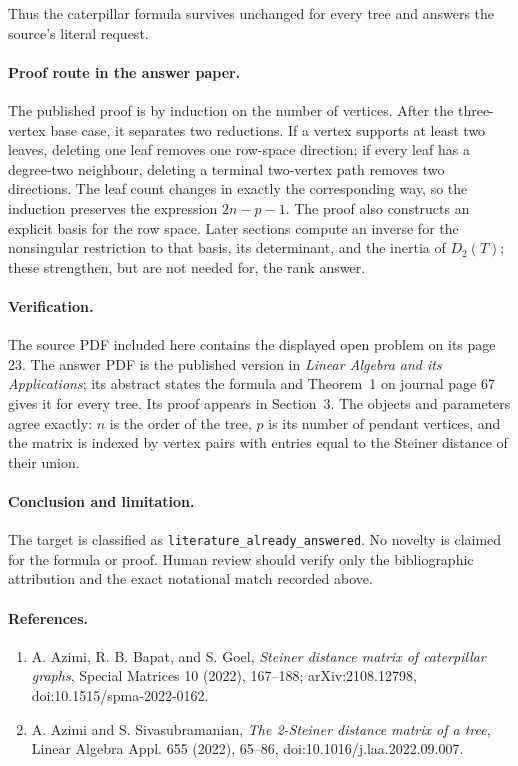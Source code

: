 \documentclass[11pt]{article}
\begin{document}
Thus the caterpillar formula survives unchanged for every tree and answers
the source's literal request.

\paragraph{Proof route in the answer paper.}
The published proof is by induction on the number of vertices.  After the
three-vertex base case, it separates two reductions.  If a vertex supports at
least two leaves, deleting one leaf removes one row-space direction; if every
leaf has a degree-two neighbour, deleting a terminal two-vertex path removes
two directions.  The leaf count changes in exactly the corresponding way, so
the induction preserves the expression $2n-p-1$.  The proof also constructs
an explicit basis for the row space.  Later sections compute an inverse for
the nonsingular restriction to that basis, its determinant, and the inertia
of $D_2(T)$; these strengthen, but are not needed for, the rank answer.

\paragraph{Verification.}
The source PDF included here contains the displayed open problem on its page
23.  The answer PDF is the published version in \emph{Linear Algebra and its
Applications}; its abstract states the formula and Theorem~1 on journal page
67 gives it for every tree.  Its proof appears in Section~3.  The objects and
parameters agree exactly: $n$ is the order of the tree, $p$ is its number of
pendant vertices, and the matrix is indexed by vertex pairs with entries equal
to the Steiner distance of their union.

\paragraph{Conclusion and limitation.}
The target is classified as \texttt{literature\_already\_answered}.  No
novelty is claimed for the formula or proof.  Human review should verify only
the bibliographic attribution and the exact notational match recorded above.

\paragraph{References.}
\begin{enumerate}
\item A. Azimi, R. B. Bapat, and S. Goel, \emph{Steiner distance matrix of
caterpillar graphs}, Special Matrices 10 (2022), 167--188;
arXiv:2108.12798, doi:10.1515/spma-2022-0162.
\item A. Azimi and S. Sivasubramanian, \emph{The 2-Steiner distance matrix of
a tree}, Linear Algebra Appl. 655 (2022), 65--86,
doi:10.1016/j.laa.2022.09.007.
\end{enumerate}
\end{document}
